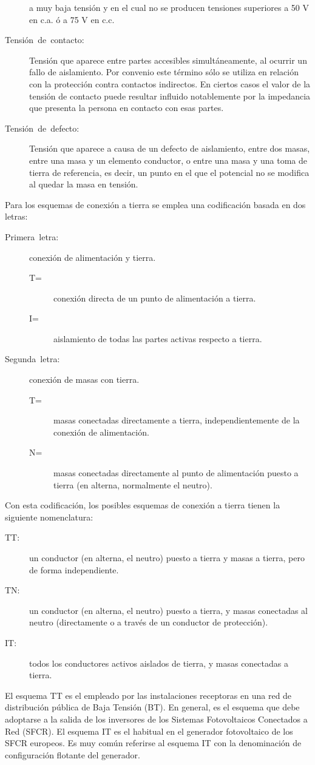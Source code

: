 \begin{description}
a muy baja tensión y en el cual no se producen tensiones superiores
a 50 V en c.a. ó a 75 V en c.c.
\item [{Tensión~de~contacto:}] Tensión que aparece entre partes accesibles
simultáneamente, al ocurrir un fallo de aislamiento. Por convenio
este término sólo se utiliza en relación con la protección contra
contactos indirectos. En ciertos casos el valor de la tensión de contacto
puede resultar influido notablemente por la impedancia que presenta
la persona en contacto con esas partes.
\item [{Tensión~de~defecto:}] Tensión que aparece a causa de un defecto
de aislamiento, entre dos masas, entre una masa y un elemento conductor,
o entre una masa y una toma de tierra de referencia, es decir, un
punto en el que el potencial no se modifica al quedar la masa en tensión.
\end{description}
Para los esquemas de conexión a tierra se emplea una codificación
basada en dos letras:
\begin{description}
\item [{Primera~letra:}] conexión de alimentación y tierra.

\begin{description}
\item [{T=}] conexión directa de un punto de alimentación a tierra.
\item [{I=}] aislamiento de todas las partes activas respecto a tierra.
\end{description}
\item [{Segunda~letra:}] conexión de masas con tierra.

\begin{description}
\item [{T=}] masas conectadas directamente a tierra, independientemente
de la conexión de alimentación.
\item [{N=}] masas conectadas directamente al punto de alimentación puesto
a tierra (en alterna, normalmente el neutro).
\end{description}
\end{description}
Con esta codificación, los posibles esquemas de conexión a tierra
tienen la siguiente nomenclatura:
\begin{description}
\item [{TT:}] un conductor (en alterna, el neutro) puesto a tierra y masas
a tierra, pero de forma independiente. 
\item [{TN:}] un conductor (en alterna, el neutro) puesto a tierra, y masas
conectadas al neutro (directamente o a través de un conductor de protección).
\item [{IT:}] todos los conductores activos aislados de tierra, y masas
conectadas a tierra. 
\end{description}
El esquema TT es el empleado por las instalaciones receptoras en una
red de distribución pública de Baja Tensión (BT). En general, es el
esquema que debe adoptarse a la salida de los inversores de los Sistemas
Fotovoltaicos Conectados a Red (SFCR). El esquema IT es el habitual
en el generador fotovoltaico de los SFCR europeos. Es muy común referirse
al esquema IT con la denominación de configuración flotante del generador.


